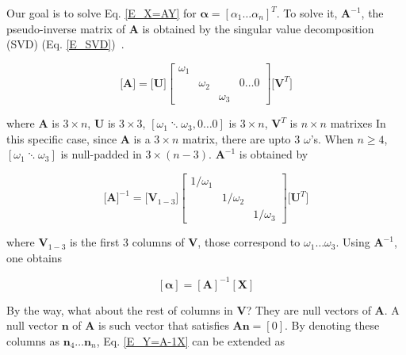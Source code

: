 \documentclass[dvipdfmx,uplatex]{article}
\begin{document}
Our goal is to solve Eq. \ref{E_X=AY} for $ \boldsymbol{\alpha} = [\alpha_1 \ldots \alpha_n]^T $. To solve it, $ \boldsymbol{A}^{-1} $, the pseudo-inverse matrix of $ \boldsymbol{A} $ is obtained by the singular value decomposition (SVD) (Eq. \ref{E_SVD})~\cite{SVD_NRC}.

\begin{equation}
  \label{E_SVD}
  \Bigg[ \boldsymbol{A} \Bigg] =
  \Bigg[ \boldsymbol{U} \Bigg]
  \left[
    \begin{array}{cccc}
      \omega_1 & \\
        & \omega_2 &   &  0 \ldots 0 \\
        &  & \omega_3 &
    \end{array}
  \right]
  \Bigg[ \boldsymbol{V}^T \Bigg]
\end{equation}

\noindent
where $ \boldsymbol{A} $ is $ 3 \times n $,
$ \boldsymbol{U} $ is $ 3 \times 3 $,
$ [\omega_1 \ddots \omega_3, 0 \ldots 0] $ is $ 3 \times n $,
$ \boldsymbol{V}^T $ is $ n \times n $ matrixes
In this specific case, since $ \boldsymbol{A} $ is a $ 3 \times n $ matrix, there are upto 3 $\omega$'s. When $ n \geq 4 $, $ [\omega_1 \ddots \omega_3 ] $ is null-padded in $ 3 \times (n-3) $.
$ \boldsymbol{A}^{-1} $ is obtained by

\begin{equation}
  \Bigg[ \boldsymbol{A} \Bigg]^{-1} =
  \Bigg[ \boldsymbol{V}_{1-3} \Bigg]
  \left[
    \begin{array}{ccc}
      1/\omega_1 & & \\
      & 1/\omega_2 & \\
      & & 1/\omega_3
    \end{array}
  \right]
  \Bigg[ \boldsymbol{U}^T \Bigg]
\end{equation}

\noindent
where $ \boldsymbol{V}_{1-3} $ is the first 3 columns of $ \boldsymbol{V} $, those correspond to $ \omega_1 \ldots \omega_3 $. Using $ \boldsymbol{A}^{-1} $, one obtains

\begin{equation}
  \label{E_Y=A-1X}
  \left[ \boldsymbol{\alpha} \right] =
  \left[ \boldsymbol{A} \right]^{-1}
  \left[ \boldsymbol{X} \right]
\end{equation}

By the way, what about the rest of columns in $ \boldsymbol{V} $? They are null vectors of $ \boldsymbol{A} $. A null vector $\boldsymbol{n}$ of $ \boldsymbol{A}$ is such vector that satisfies $ \boldsymbol{A} \boldsymbol{n} = [0]$. By denoting these columns as $ \boldsymbol{n}_4 \ldots \boldsymbol{n}_n $, Eq. \ref{E_Y=A-1X} can be extended as
\end{document}
